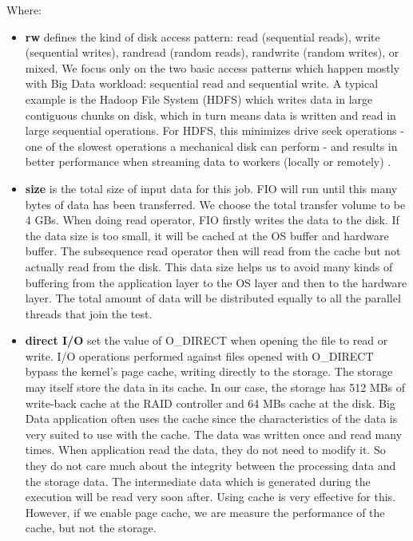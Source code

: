 \documentclass{acmsig}
\begin{document}
Where:
\begin{itemize}
  \item \textbf{rw} defines the kind of disk access pattern: read (sequential reads), write (sequential writes), randread (random reads), randwrite (random writes), or mixed. We focus only on the two basic access patterns which happen mostly with Big Data workload: sequential read and sequential write. A typical example is the Hadoop File System (HDFS) which writes data in large contiguous chunks on disk, which in turn means data is written and read in large sequential operations. For HDFS, this minimizes drive seek operations - one of the slowest operations a mechanical disk can perform - and results in better performance when streaming data to workers (locally or remotely) \cite[Chapter~2]{HadoopOperationsBook}. 
 \item \textbf{size} is the total size of input data for this job. FIO will run until this many bytes of data has been transferred. We choose the total transfer volume to be 4 GBs. When doing read operator, FIO firstly writes the data to the disk. If the data size is too small, it will be cached at the OS buffer and hardware buffer. The subsequence read operator then will read from the cache but not actually read from the disk. This data size helps us to avoid many kinds of buffering from the application layer to the OS layer and then to the hardware layer. The total amount of data will be distributed equally to all the parallel threads that join the test.
  \item \textbf{direct I/O} set the value of O\_DIRECT when opening the file to read or write. I/O operations performed against files opened with O\_DIRECT bypass the kernel's page cache, writing directly to the storage. The storage may itself store the data in its cache. In our case, the storage has 512 MBs of write-back cache at the RAID controller and 64 MBs cache at the disk. Big Data application often uses the cache since the characteristics of the data is very suited to use with the cache. The data was written once and read many times. When application read the data, they do not need to modify it. So they do not care much about the integrity between the processing data and the storage data. The intermediate data which is generated during the execution will be read very soon after. Using cache is very effective for this. However, if we enable page cache, we are measure the performance of the cache, but not the storage. 

\end{itemize}
\end{document}
